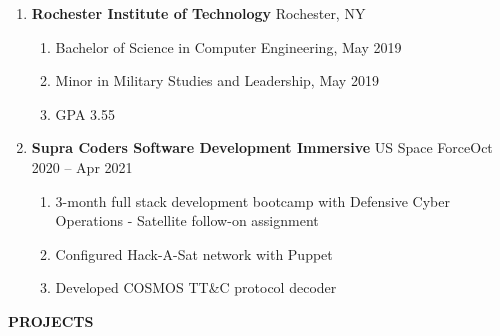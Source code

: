 \documentclass[11pt]{article}
\begin{document}
\begin{enumerate}[label={}, itemsep=5pt]
    \item \textbf{Rochester Institute of Technology} \textbar{} Rochester, NY
    \begin{enumerate}[label={--}]
        \item Bachelor of Science in Computer Engineering, May 2019
        \item Minor in Military Studies and Leadership, May 2019
        \item GPA 3.55
    \end{enumerate}
    \item \textbf{Supra Coders Software Development Immersive} \textbar{} US Space Force\hfill Oct 2020 -- Apr 2021
    \begin{enumerate}[label={--}]
        \item 3-month full stack development bootcamp with Defensive Cyber Operations - Satellite follow-on assignment
        \item Configured Hack-A-Sat network with Puppet
        \item Developed COSMOS TT\&C protocol decoder
    \end{enumerate}
\end{enumerate}
{\Large \textbf{PROJECTS}}
\end{document}
